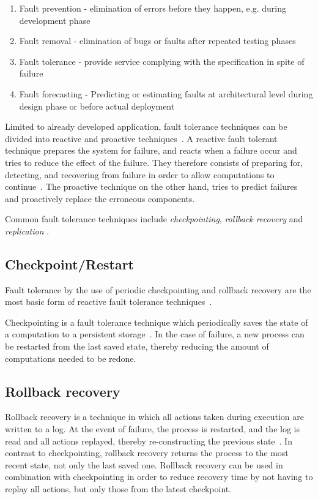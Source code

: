 \documentclass{cslthse-msc}
\begin{document}
\begin{enumerate}
\item Fault prevention - elimination of errors before they happen, e.g. during development phase
\item Fault removal - elimination of bugs or faults after repeated testing phases
\item Fault tolerance - provide service complying with the specification in spite of failure
\item Fault forecasting - Predicting or estimating faults at architectural level during design phase or before actual deployment
\end{enumerate}

Limited to already developed application, fault tolerance techniques can be divided into reactive and proactive techniques~\cite{faultToleranceChallenges}. A reactive fault tolerant technique prepares the system for failure, and reacts when a failure occur and tries to reduce the effect of the failure. They therefore consists of preparing for, detecting, and recovering from failure in order to allow computations to continue~\cite{relGridSystems}. The proactive technique on the other hand, tries to predict failures and proactively replace the erroneous components.

Common fault tolerance techniques include \emph{checkpointing}, \emph{rollback recovery} and \emph{replication} \cite{relGridSystems}.

\subsection{Checkpoint/Restart} \label{subsec:background_checkpoint}
Fault tolerance by the use of periodic checkpointing and rollback recovery are the most basic form of reactive fault tolerance techniques~\cite{surveyFaultParallel}.

Checkpointing is a fault tolerance technique which periodically saves the state of a computation to a persistent storage~\cite{relGridSystems, surveyFaultParallel}. In the case of failure, a new process can be restarted from the last saved state, thereby reducing the amount of computations needed to be redone.

\subsection{Rollback recovery} \label{subsec:background_rollback}
Rollback recovery is a technique in which all actions taken during execution are written to a log. At the event of failure, the process is restarted, and the log is read and all actions replayed, thereby re-constructing the previous state~\cite{surveyFaultParallel}. In contrast to checkpointing, rollback recovery returns the process to the most recent state, not only the last saved one. Rollback recovery can be used in combination with checkpointing in order to reduce recovery time by not having to replay all actions, but only those from the latest checkpoint.
\end{document}
